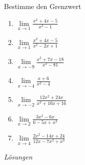 \begin{ueb}
    {}{}
    Bestimme den Grenzwert


    \begin{enumerate}
        \item $\lim\limits_{x \to 1} \frac{x^2 + 4x - 5}{x^2 - 1}$
        \item $\lim\limits_{x \to 1} \frac{x^2 + 4x - 5}{x^2 - 2x + 1}$
        \item $\lim\limits_{x \to -9} \frac{x^2 + 7x - 18}{x^2 - 81}$
        \item $\lim\limits_{x \to -4} \frac{x + 6}{x^2 - 4}$
        \item $\lim\limits_{x \to -2} \frac{12x^2 + 24x}{x^2 + 10x + 16}$
        \item $\lim\limits_{x \to 2} \frac{3x^2 - 6x}{6 - 5x + x^2}$
        \item $\lim\limits_{x \to 4} \frac{2x^2 - 14x + 24}{12x - 7x^2 + x^3}$
    \end{enumerate}
\end{ueb}
\clearpage
\emph{Lösungen}
